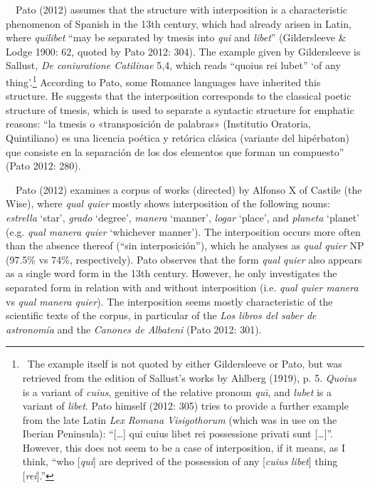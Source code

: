 \begin{styleStandard}
\ \ Pato (2012) assumes that the structure with interposition is a characteristic phenomenon of Spanish in the 13th century, which had already arisen in Latin, where \textit{quilibet} “may be separated by tmesis into \textit{qui} and \textit{libet}” (Gildersleeve \& Lodge 1900: 62, quoted by Pato 2012: 304). The example given by Gildersleeve is Sallust, \textit{De coniuratione Catilinae} 5,4, which reads “quoius rei lubet” ‘of any thing’.\footnote{\ The example itself is not quoted by either Gildersleeve or Pato, but was retrieved from the edition of Sallust’s works by Ahlberg (1919), p. 5. \textit{Quoius} is a variant of \textit{cuius}, genitive of the relative pronoun \textit{qu\=\i}, and \textit{lubet} is a variant of \textit{libet}. \textrm{Pato himself (2012: 305) tries to provide a further example from the late Latin}\textrm{\textbf{ }}\textit{Lex Romana Visigothorum} (which was in use on the Iberian Peninsula): “[…] qui cuius libet rei possessione privati sunt […]”. However, this does not seem to be a case of interposition, if it means, as I think, “who [\textit{qui}] are deprived of the possession of any [\textit{cuius} \textit{libet}] thing [\textit{rei}].”} According to Pato, some Romance languages have inherited this structure. He suggests that the interposition corresponds to the classical poetic structure of tmesis, which is used to separate a syntactic structure for emphatic reasons: “la tmesis o «transposición de palabras» (Institutio Oratoria, Quintiliano) es una licencia poética y retórica clásica (variante del hipérbaton) que consiste en la separación de los dos elementos que forman un compuesto” (Pato 2012: 280). 
\end{styleStandard}

\begin{styleStandard}
\ \ Pato (2012) examines a corpus of works (directed) by Alfonso X of Castile (the Wise), where \textit{qual quier} mostly shows interposition of the following nouns: \textit{estrella} ‘star’, \textit{grado} ‘degree’, \textit{manera} ‘manner’, \textit{logar} ‘place’, and \textit{planeta} ‘planet’ (e.g. \textit{qual manera quier} ‘whichever manner’). The interposition occurs more often than the absence thereof (“sin interposición”), which he analyses as \textit{qual quier} NP (97.5\% vs 74\%, respectively). Pato observes that the form \textit{qual quier} also appears as a single word form in the 13th century. However, he only investigates the separated form in relation with and without interposition (i.e. \textit{qual quier manera} vs \textit{qual manera quier}). The interposition seems mostly characteristic of the scientific texts of the corpus, in particular of the \textit{Los libros del saber de astronomía} and the \textit{Canones de Albateni} (Pato 2012: 301). 
\end{styleStandard}

